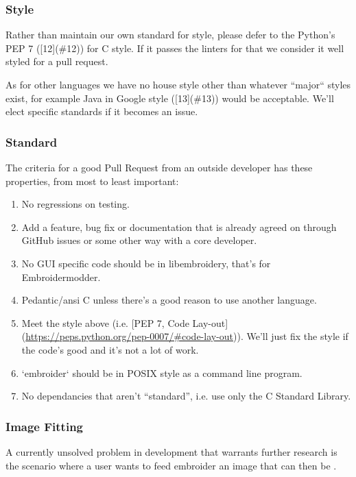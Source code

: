 \documentclass[a4paper, 11pt]{report}
\begin{document}
\subsubsection{ Style}

Rather than maintain our own standard for style, please defer to
the Python's PEP 7 ([12](\#12)) for C style.
If it passes the linters for that we consider it well styled
for a pull request.

As for other languages we have no house style other than whatever
``major`` styles exist, for example Java in
Google style ([13](\#13))
would be acceptable. We'll elect specific standards if it becomes
an issue.

\subsubsection{Standard}

The criteria for a good Pull Request from an outside developer has these properties, from most to least important:

\begin{enumerate}
\item No regressions on testing.
\item Add a feature, bug fix or documentation that is already agreed on through GitHub issues or some other way with a core developer.
\item No GUI specific code should be in libembroidery, that's for Embroidermodder.
\item Pedantic/ansi C unless there's a good reason to use another language.
\item Meet the style above (i.e. [PEP 7, Code Lay-out](\url{https://peps.python.org/pep-0007/#code-lay-out})).
   We'll just fix the style if the code's good and it's not a lot of work.
\item `embroider` should be in POSIX style as a command line program.
\item No dependancies that aren't ``standard'', i.e. use only the C Standard Library.
\end{enumerate}

\subsubsection{Image Fitting}

A currently unsolved problem in development that warrants further research is
the scenario where a user wants to feed embroider an image that can then be .
\end{document}
